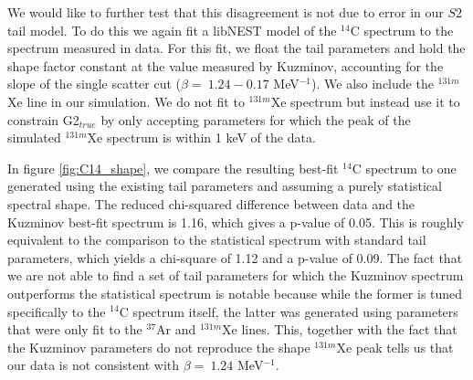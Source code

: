 We would like to further test that this disagreement is not due to error in our $S2$ tail model. To do this we again fit a libNEST model of the $^{14}$C spectrum to the spectrum measured in data. For this fit, we float the tail parameters and hold the shape factor constant at the value measured by Kuzminov, accounting for the slope of the single scatter cut ($\beta = \ 1.24-0.17$ MeV$^{-1}$). We also include the $^{131m}$Xe line in our simulation. We do not fit to $^{131m}$Xe spectrum but instead use it to constrain G2$_{true}$ by only accepting parameters for which the peak of the simulated $^{131m}$Xe spectrum is within 1 keV of the data. 

In figure \ref{fig:C14_shape}, we compare the resulting best-fit $^{14}$C spectrum to one generated using the existing tail parameters and assuming a purely statistical spectral shape. The reduced chi-squared difference between data and the Kuzminov best-fit spectrum is 1.16, which gives a p-value of 0.05. This is roughly equivalent to the comparison to the statistical spectrum with standard tail parameters, which yields a chi-square of 1.12 and a p-value of 0.09. The fact that we are not able to find a set of tail parameters for which the Kuzminov spectrum outperforms the statistical spectrum is notable because while the former is tuned specifically to the $^{14}$C spectrum itself, the latter was generated using parameters that were only fit to the $^{37}$Ar and $^{131m}$Xe lines. This, together with the fact that the Kuzminov parameters do not reproduce the shape $^{131m}$Xe peak tells us that our data is not consistent with $\beta = \ 1.24$ MeV$^{-1}$.

